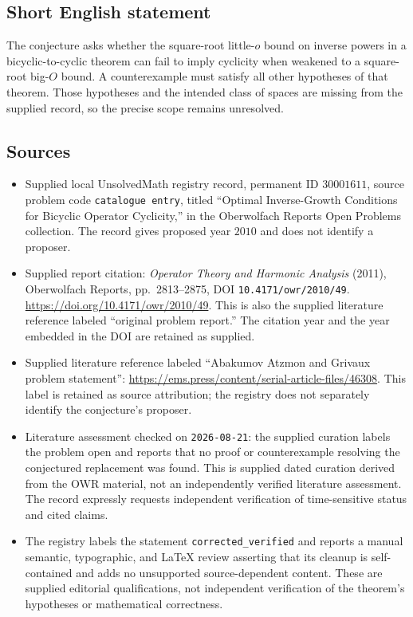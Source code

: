 \documentclass[11pt]{article}
\begin{document}
\subsection{Short English statement}
The conjecture asks whether the square-root little-\(o\) bound on inverse powers in a bicyclic-to-cyclic theorem can fail to imply cyclicity when weakened to a square-root big-\(O\) bound. A counterexample must satisfy all other hypotheses of that theorem. Those hypotheses and the intended class of spaces are missing from the supplied record, so the precise scope remains unresolved.
\subsection{Sources}
\begin{itemize}
\item Supplied local UnsolvedMath registry record, permanent ID \(30001611\), source problem code \texttt{catalogue entry}, titled ``Optimal Inverse-Growth Conditions for Bicyclic Operator Cyclicity,'' in the Oberwolfach Reports Open Problems collection. The record gives proposed year \(2010\) and does not identify a proposer.
\item Supplied report citation: \emph{Operator Theory and Harmonic Analysis} (2011), Oberwolfach Reports, pp.~2813--2875, DOI \texttt{10.4171/owr/2010/49}. \url{https://doi.org/10.4171/owr/2010/49}. This is also the supplied literature reference labeled ``original problem report.'' The citation year and the year embedded in the DOI are retained as supplied.
\item Supplied literature reference labeled ``Abakumov Atzmon and Grivaux problem statement'': \url{https://ems.press/content/serial-article-files/46308}. This label is retained as source attribution; the registry does not separately identify the conjecture's proposer.
\item Literature assessment checked on \texttt{2026-08-21}: the supplied curation labels the problem open and reports that no proof or counterexample resolving the conjectured replacement was found. This is supplied dated curation derived from the OWR material, not an independently verified literature assessment. The record expressly requests independent verification of time-sensitive status and cited claims.
\item The registry labels the statement \texttt{corrected\_verified} and reports a manual semantic, typographic, and LaTeX review asserting that its cleanup is self-contained and adds no unsupported source-dependent content. These are supplied editorial qualifications, not independent verification of the theorem's hypotheses or mathematical correctness.
\end{itemize}
\end{document}
